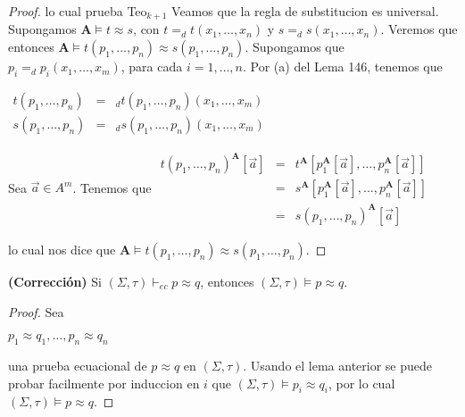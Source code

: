 \begin{proof}
    lo cual prueba Teo$_{k+1}$
    Veamos que la regla de substitucion es universal. Supongamos $\mathbf{A} \models t\approx s$, con $t=_{d}t(x_{1}, \dotsc, x_{n})$ y $ s=_{d}s(x_{1}, \dotsc, x_{n})$. Veremos que entonces $\mathbf{A}\models t(p_{1}, \dotsc, p_{n})\approx s(p_{1}, \dotsc, p_{n}).$ Supongamos que $ p_{i}=_{d}p_{i}(x_{1}, \dotsc, x_{m})$, para cada $i=1, \dotsc, n.$ Por (a) del Lema 146, tenemos que

    $\displaystyle \begin{array}{rcl} t(p_{1}, \dotsc, p_{n}) & =& _{d}t(p_{1}, \dotsc, p_{n})(x_{1}, \dotsc, x_{m}) \\ s(p_{1}, \dotsc, p_{n}) & =& _{d}s(p_{1}, \dotsc, p_{n})(x_{1}, \dotsc, x_{m}) \end{array} $

    Sea $\vec{a}\in A^{m}$. Tenemos que
    $\displaystyle \begin{array}{rcl} t(p_{1}, \dotsc, p_{n})^{\mathbf{A}}\left\lbrack \vec{a}\right\rbrack & = & t^{\mathbf{A}} \left\lbrack p_{1}^{\mathbf{A}}\left\lbrack \vec{a}\right\rbrack , \dotsc, p_{n}^{\mathbf{A}}\left\lbrack \vec{a}\right\rbrack \right\rbrack \\ & = & s^{\mathbf{A}}\left\lbrack p_{1}^{\mathbf{A}}\left\lbrack \vec{a}\right\rbrack , \dotsc, p_{n}^{\mathbf{A}}\left\lbrack \vec{a}\right\rbrack \right\rbrack \\ & = & s(p_{1}, \dotsc, p_{n})^{\mathbf{A}}\left\lbrack \vec{a}\right\rbrack \end{array} $

    lo cual nos dice que $\mathbf{A}\models t(p_{1}, \dotsc, p_{n})\approx s(p_{1}, \dotsc, p_{n})$.
  \end{proof}

  \begin{theorem} \label{theorem_88}
    \PN \textbf{(Corrección)} Si $(\Sigma, \tau) \vdash_{ec} p \approx q$, entonces $(\Sigma, \tau) \models p \approx q$.
  \end{theorem}
  \begin{proof}
    Sea

    $\displaystyle p_{1}\approx q_{1}, \dotsc, p_{n}\approx q_{n} $

    una prueba ecuacional de $p\approx q$ en $(\Sigma, \tau).$ Usando el lema anterior se puede probar facilmente por induccion en $i$ que $(\Sigma, \tau)\models p_{i}\approx q_{i}$, por lo cual $(\Sigma, \tau)\models p\approx q. $
  \end{proof}

